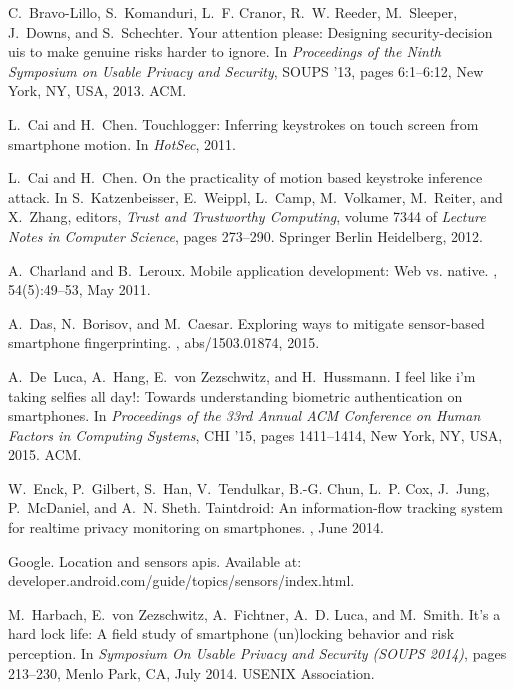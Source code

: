 \documentclass[10pt,twocolumn]{article}
\begin{document}
\begin{thebibliography}{10}
C.~Bravo-Lillo, S.~Komanduri, L.~F. Cranor, R.~W. Reeder, M.~Sleeper, J.~Downs,
  and S.~Schechter.
\newblock Your attention please: Designing security-decision uis to make
  genuine risks harder to ignore.
\newblock In {\em Proceedings of the Ninth Symposium on Usable Privacy and
  Security}, SOUPS '13, pages 6:1--6:12, New York, NY, USA, 2013. ACM.

L.~Cai and H.~Chen.
\newblock Touchlogger: Inferring keystrokes on touch screen from smartphone
  motion.
\newblock In {\em HotSec}, 2011.

L.~Cai and H.~Chen.
\newblock On the practicality of motion based keystroke inference attack.
\newblock In S.~Katzenbeisser, E.~Weippl, L.~Camp, M.~Volkamer, M.~Reiter, and
  X.~Zhang, editors, {\em Trust and Trustworthy Computing}, volume 7344 of {\em
  Lecture Notes in Computer Science}, pages 273--290. Springer Berlin
  Heidelberg, 2012.

A.~Charland and B.~Leroux.
\newblock Mobile application development: Web vs. native.
, 54(5):49--53, May 2011.

A.~Das, N.~Borisov, and M.~Caesar.
\newblock Exploring ways to mitigate sensor-based smartphone fingerprinting.
, abs/1503.01874, 2015.

A.~De~Luca, A.~Hang, E.~von Zezschwitz, and H.~Hussmann.
\newblock I feel like i'm taking selfies all day!: Towards understanding
  biometric authentication on smartphones.
\newblock In {\em Proceedings of the 33rd Annual ACM Conference on Human
  Factors in Computing Systems}, CHI '15, pages 1411--1414, New York, NY, USA,
  2015. ACM.

W.~Enck, P.~Gilbert, S.~Han, V.~Tendulkar, B.-G. Chun, L.~P. Cox, J.~Jung,
  P.~McDaniel, and A.~N. Sheth.
\newblock Taintdroid: An information-flow tracking system for realtime privacy
  monitoring on smartphones.
, June 2014.

Google.
\newblock Location and sensors apis.
\newblock Available at: developer.android.com/guide/topics/sensors/index.html.

M.~Harbach, E.~von Zezschwitz, A.~Fichtner, A.~D. Luca, and M.~Smith.
\newblock It{\textquoteright}s a hard lock life: A field study of smartphone
  (un)locking behavior and risk perception.
\newblock In {\em Symposium On Usable Privacy and Security (SOUPS 2014)}, pages
  213--230, Menlo Park, CA, July 2014. USENIX Association.


\end{thebibliography}
\end{document}
